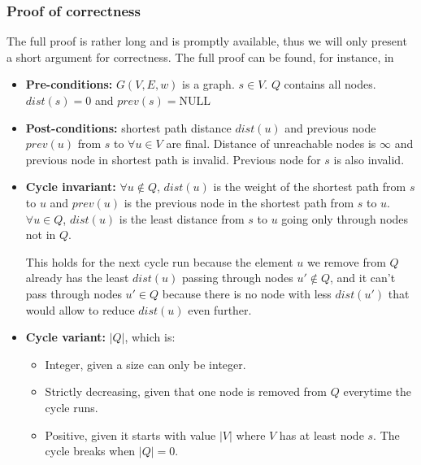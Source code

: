 \documentclass{report}[a4paper]
\theoremstyle{remark}
\begin{document}
\subsubsection{Proof of correctness}
The full proof is rather long and is promptly available, thus we will only present a short argument for correctness. The full proof can be found, for instance, in \cite[p.~659]{intro-alg}
\begin{itemize}
    \item \textbf{Pre-conditions:} $G(V, E, w)$ is a graph. $s \in V$. $Q$ contains all nodes. $dist(s)=0$ and $prev(s)=\text{NULL}$
    \item \textbf{Post-conditions:} shortest path distance $dist(u)$ and previous node $prev(u)$ from $s$ to $\forall u \in V$ are final. Distance of unreachable nodes is $\infty$ and previous node in shortest path is invalid. Previous node for $s$ is also invalid.\par
    \item \textbf{Cycle invariant:} $\forall u \not \in Q$, $dist(u)$ is the weight of the shortest path from $s$ to $u$ and $prev(u)$ is the previous node in the shortest path from $s$ to $u$. $\forall u \in Q$, $dist(u)$ is the least distance from $s$ to $u$ going only through nodes not in $Q$.\par
    This holds for the next cycle run because the element $u$ we remove from $Q$ already has the least $dist(u)$ passing through nodes $u' \not \in Q$, and it can't pass through nodes $u' \in Q$ because there is no node with less $dist(u')$ that would allow to reduce $dist(u)$ even further.
    \item \textbf{Cycle variant:} $|Q|$, which is:
    \begin{itemize}
        \item Integer, given a size can only be integer.
        \item Strictly decreasing, given that one node is removed from $Q$ everytime the cycle runs.
        \item Positive, given it starts with value $|V|$ where $V$ has at least node $s$. The cycle breaks when $|Q| = 0$.
    \end{itemize}
\end{itemize}
\end{document}
